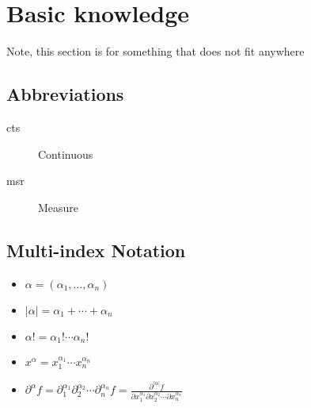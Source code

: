 \section{Basic knowledge}

Note, this section is for something that does not fit anywhere

\subsection{Abbreviations}
\begin{description}
  \item[cts] Continuous
  \item[msr] Measure
\end{description}


\subsection{Multi-index Notation}
\label{multiindex}
\begin{itemize}
\item $\alpha = (\alpha_1, \ldots, \alpha_n)$
\item $|\alpha| = \alpha_1 + \cdots + \alpha_n$
\item $\alpha! = \alpha_1! \cdots \alpha_n!$
\item $x^\alpha = x_1^{\alpha_1} \cdots x_n^{\alpha_n}$
\item $\partial^\alpha f = \partial_1^{\alpha_1}\partial_2^{\alpha_2} \cdots \partial_n^{\alpha_n} f = \frac{\partial^{|\alpha|}f}{\partial x_1^{\alpha_1} \partial x_2^{\alpha_2} \cdots \partial x_n^{\alpha_n}}$
\end{itemize}
